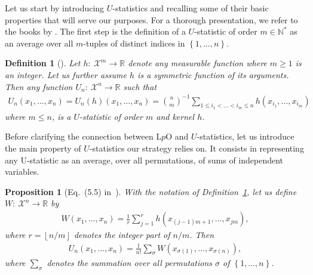 \documentclass[twoside,11pt]{article}
\numberwithin{equation}{section}
\newtheorem{defn}{Definition}[section]
\newtheorem{prop}{Proposition}[section]
\newcommand{\floor}[1]{\left\lfloor #1 \right\rfloor}
\newcommand{\1}{\mathds{1}}%
\newcommand{\paren}[1]{\left( #1 \right)}
\newcommand{\acc}[1]{\left\{ #1 \right\}}
\newcommand{\R}{\mathbb{R}}
\newcommand{\N}{\mathbb{N}}
\newcommand{\X}{\mathcal{X}}
\numberwithin{equation}{section}
\theoremstyle{plain}
\begin{document}
Let us start by introducing $U$-statistics and recalling some of their basic properties that will serve our purposes. For a thorough presentation, we refer to the books by \cite{Serf:1980,Ko_Bo:1994}.
%
The first step is the definition of a $U$-statistic of order $m\in\N^*$ as an average over all $m$-tuples of distinct indices in $\acc{1,\ldots,n}$.
%
\begin{defn}[\cite{Ko_Bo:1994}] \label{def.Ustatistic}
Let $h:\ \X^m \longrightarrow \R $ denote any measurable function where $m\geq 1$ is an integer.
%
Let us further assume $h$ is a symmetric function of its arguments.
%
Then any function $U_n:\ \X^n \longrightarrow \R$ such that
\begin{align*}
  U_n(x_1, \ldots,x_n) = U_n(h)(x_1, \ldots,x_n) = { n\choose m}^{-1} \sum_{1\leq i_1<\ldots<i_m\leq n} h\paren{ x_{i_1},\ldots, x_{i_m} }
\end{align*}
where $m\leq n$, is a $U$-statistic of order $m$ and kernel $h$.
\end{defn}
%
Before clarifying the connection between L$p$O and $U$-statistics, let us introduce the main property of $U$-statistics our strategy relies on.
%
It consists in representing any U-statistic as an average, over all permutations, of sums of independent variables.
%
\begin{prop}[Eq.~(5.5) in~\cite{Hoef:1963}]\label{Prop : HoeffdingDecomposition}
  With the notation of Definition~\ref{def.Ustatistic}, let us define $W:\ \X^n \longrightarrow \R$ by
\begin{align}\label{eq.Ustatistics.sum.independent}
  W(x_1,\ldots,x_n) = \frac{1}{r} \sum_{j=1}^r h\paren{ x_{(j-1)m+1},\ldots,x_{jm} } ,
\end{align}
where $r = \floor{n/m}$ denotes the integer part of $n/m$.
%
Then
\begin{align*}
  U_n(x_1, \ldots,x_n) = \frac{1}{n!} \sum_{\sigma}
W\paren{ x_{\sigma(1)},\ldots,x_{\sigma(n)} } ,
\end{align*}
where $\sum_{\sigma}$ denotes the summation over all permutations $\sigma$ of $\acc{1,\ldots,n}$.
\end{prop}

\medskip
\end{document}
